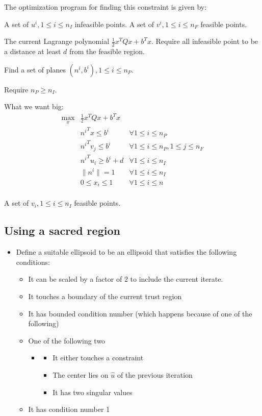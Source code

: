 The optimization program for finding this constraint is given by:

A set of $u^i, 1 \le i \le n_{I}$ infeasible points.
A set of $v^i, 1 \le i \le n_{F}$ feasible points.

The current Lagrange polynomial $\frac 1 2 x^T Q x + b^Tx$.
Require all infeasible point to be a distance at least $d$ from the feasible region.


Find a set of planes $(n^i, b^i), 1 \le i \le n_{P}$.

Require $n_P \ge n_I$.


What we want big:
\begin{align}
\max_{x} & \frac 1 2 x^T Q x + b^Tx &\\
 & {n^i}^T x \le b^i & \forall 1 \le i \le n_{P} \\
 & {n^i}^T v_j \le b^i & \forall 1 \le i \le n_{P}, 1\le j\le  n_{F} \\
 & {n^i}^T u_i \ge b^i + d & \forall 1 \le i \le n_{I} \\
 & \| n^i \| = 1 & \forall 1 \le i \le n_{I} \\
 & 0 \le x_i \le 1 & \forall 1 \le i \le n \\
\end{align}


A set of $v_i, 1 \le i \le n_{I}$ feasible points.




\subsection{Using a sacred region}


\begin{itemize}
    \item Define a suitable ellipsoid to be an ellipsoid that satisfies the following conditions: \begin{itemize}
        \item It can be scaled by a factor of 2 to include the current iterate.
        \item It touches a boundary of the current trust region
        \item It has bounded condition number (which happens because of one of the following)
        \item One of the following two  \begin{itemize}
            \item \begin{itemize}
                \item It either touches a constraint
                \item The center lies on $\hat u$ of the previous iteration
                \item It has two singular values
            \end{itemize}
        \end{itemize}
        \item It has condition number 1
    \end{itemize}
\end{itemize}



